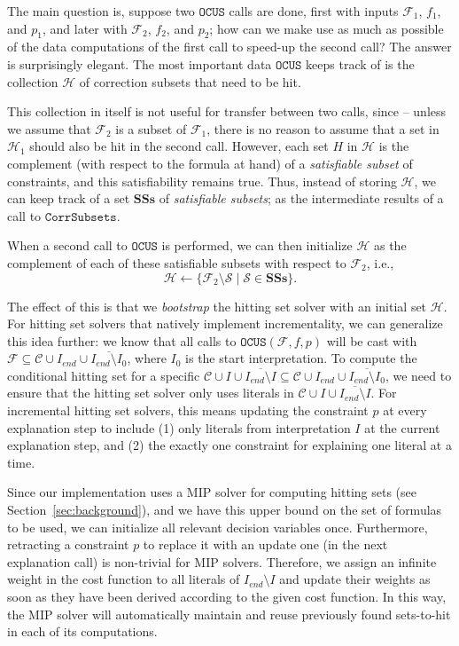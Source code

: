 \documentclass[a4paper,UKenglish,cleveref, autoref, thm-restate, pdfa]{lipics-v2021}
\newcommand\m[1]{\mathcal{#1}}
\newcommand\setstohit{\ensuremath{\m{H} }\xspace}
\newcommand\subsetT{\ensuremath{\m{S} }\xspace}
\newcommand\Iend{\ensuremath{I_\mathit{end} }\xspace}
\newcommand\formula{\ensuremath{\m{F} }\xspace}
\newcommand\formulac{\ensuremath{\m{C} }\xspace}
\newcommand\mm[1]{\ensuremath{#1}\xspace}
\newcommand\call[1]{\mm{\texttt{#1}}}
\newcommand\grow{\mm{\call{Grow}}}
\newcommand\comus{\mm{\call{OCUS}}}
\newcommand\corrsubsets{\mm{\call{CorrSubsets}}}
\newcommand\satsets{\mm{\mathbf{SSs}}}
\begin{document}
	The main question is, suppose two \comus calls are done, first with inputs $\formula_1$, $f_1$, and $p_1$, and later with $\formula_2$, $f_2$, and $p_2$; how can we make use as much as possible of the data computations of the first call to speed-up the second call? The answer is surprisingly elegant. The most important data \comus keeps track of  is the collection \setstohit of correction subsets that need to be hit.
	
	This collection in itself is not useful for transfer between two calls, since -- unless we assume that $\formula_2$ is a subset of $\formula_1$, there is no reason to assume that a set in $\setstohit_1$ should also be hit in the second call. 
	However, each set $H$ in $\setstohit$ is the complement (with respect to the formula at hand) of a \emph{satisfiable subset} of constraints, and this satisfiability remains true. 
	Thus, instead of storing $\setstohit$, we can keep track of a set \satsets of \emph{satisfiable subsets}; 
	as the intermediate results of a call to \corrsubsets.
	
	When a second call to \comus is performed, we can then initialize $\setstohit$ as the complement of each of these satisfiable subsets with respect to $\formula_2$, i.e., \[\setstohit\gets \{\formula_2\setminus \m{S}\mid \m{S}\in \satsets\}.\]
	
	The effect of this is that we \textit{bootstrap} the hitting set solver with an initial set $\setstohit$. 
	For hitting set solvers that natively implement incrementality, we can generalize this idea further: we know that all calls to $\comus(\formula,f,p)$ will be cast with $\formula \subseteq \m{C}\cup \Iend \cup \overline{\Iend \setminus I_0}$, where $I_0$ is the start interpretation. 
	To compute the conditional hitting set for a specific $\formulac\cup I\cup \overline{\Iend\setminus I} \subseteq \m{C}\cup \Iend \cup \overline{\Iend \setminus I_0}$, we need to ensure that the hitting set solver only uses literals in $\formulac\cup I\cup \overline{\Iend\setminus I}$. 
	For incremental hitting set solvers, this means updating the constraint $p$ at every explanation step to include (1) only literals from interpretation $I$ at the current explanation step, and (2) the exactly one constraint for explaining one literal at a time.
	
	Since our implementation uses a MIP solver for computing hitting sets (see Section~\ref{sec:background}), and we have this upper bound on the set of formulas to be used, we can initialize all relevant decision variables once. 
	Furthermore, retracting a constraint $p$ to replace it with an update one (in the next explanation call) is non-trivial for MIP solvers. 
	Therefore, we assign an infinite weight in the cost function to all literals of $\Iend\setminus I$ and update their weights as soon as they have been derived according to the given cost function.
	In this way, the MIP solver will automatically maintain and reuse previously found sets-to-hit in each of its computations. 
	
\end{document}
